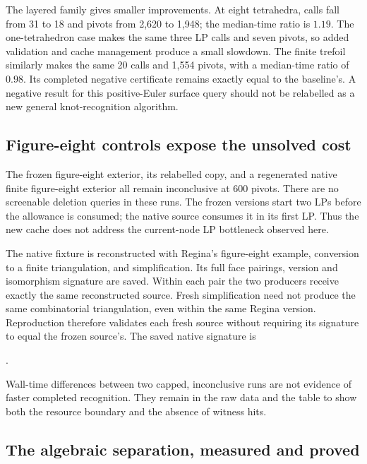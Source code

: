 The layered family gives smaller improvements. At eight tetrahedra, calls
fall from 31 to 18 and pivots from 2,620 to 1,948; the median-time ratio is
$1.19$. The one-tetrahedron case makes the same three LP calls and seven
pivots, so added validation and cache management produce a small slowdown.
The finite trefoil similarly makes the same 20 calls and 1,554 pivots, with
a median-time ratio of $0.98$. Its completed negative certificate remains
exactly equal to the baseline's. A negative result for this positive-Euler
surface query should not be relabelled as a new general knot-recognition
algorithm.

\subsection{Figure-eight controls expose the unsolved cost}

The frozen figure-eight exterior, its relabelled copy, and a regenerated
native finite figure-eight exterior all remain inconclusive at 600 pivots.
There are no screenable deletion queries in these runs. The frozen versions
start two LPs before the allowance is consumed; the native source consumes
it in its first LP. Thus the new cache does not address the current-node
LP bottleneck observed here.

The native fixture is reconstructed with Regina's figure-eight example,
conversion to a finite triangulation, and simplification. Its full face
pairings, version and isomorphism signature are saved. Within each pair the
two producers receive exactly the same reconstructed source. Fresh
simplification need not produce the same combinatorial triangulation, even
within the same Regina version. Reproduction therefore validates each fresh
source without requiring its signature to equal the frozen source's.
The saved native signature is
\begin{center}.\end{center}

Wall-time differences between two capped, inconclusive runs are not evidence
of faster completed recognition. They remain in the raw data and the table
to show both the resource boundary and the absence of witness hits.

\subsection{The algebraic separation, measured and proved}



